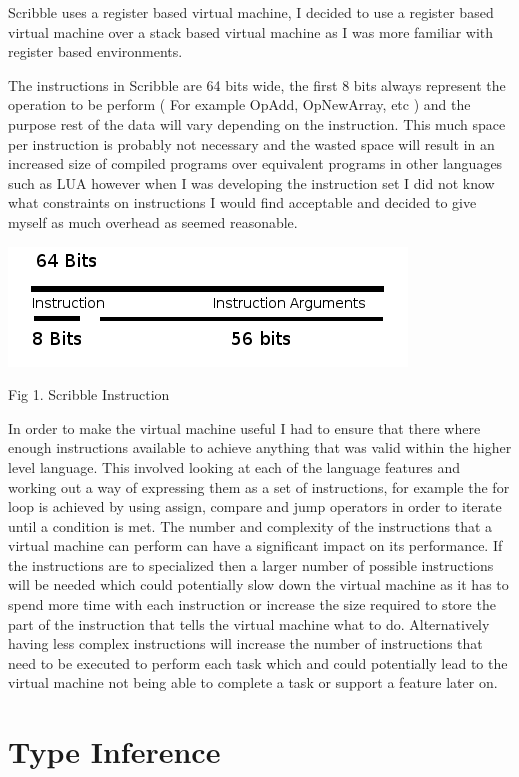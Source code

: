 \documentclass[]{final_report}
\begin{document}
Scribble uses a register based virtual machine, I decided to use a register based virtual machine over a stack based virtual machine as I was more familiar with register based environments.

The instructions in Scribble are 64 bits wide, the first 8 bits always represent the operation to be perform ( For example OpAdd, OpNewArray, etc ) and the purpose rest of the data will vary depending on the instruction. This much space per instruction is probably not necessary and the wasted space will result in an increased size of compiled programs over equivalent programs in other languages such as LUA however when I was developing the instruction set I did not know what constraints on instructions I would find acceptable and decided to give myself as much overhead as seemed reasonable.

\includegraphics{"Instruction"}


Fig 1. Scribble Instruction

In order to make the virtual machine useful I had to ensure that there where enough instructions available to achieve anything that was valid within the higher level language. This involved looking at each of the language features and working out a way of expressing them as a set of instructions, for example the for loop is achieved by using assign, compare and jump operators in order to iterate until a condition is met. The number and complexity of the instructions that a virtual machine can perform can have a significant impact on its performance. If the instructions are to specialized then a larger number of possible instructions will be needed which could potentially slow down the virtual machine as it has to spend more time with each instruction or increase the size required to store the part of the instruction that tells the virtual machine what to do. Alternatively having less complex instructions will increase the number of instructions that need to be executed to perform each task which  and could potentially lead to the virtual machine not being able to complete a task or support a feature later on.

\chapter{Type Inference}
\end{document}
